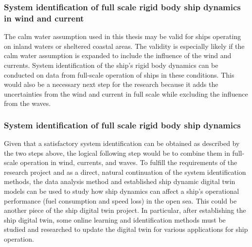\subsubsection*{\normalfont \color{black} \textbf{System identification of full scale rigid body ship dynamics in wind and current}}
The calm water assumption used in this thesis may be valid for ships operating on inland waters or sheltered coastal areas. The validity is especially likely if the calm water assumption is expanded to include the influence of the wind and currents. System identification of the ship's rigid body dynamics can be conducted on data from full-scale operation of ships in these conditions. This would also be a necessary next step for the research because it adds the uncertainties from the wind and current in full scale while excluding the influence from the waves.

\subsubsection*{\normalfont \color{black} \textbf{System identification of full scale rigid body ship dynamics}}
Given that a satisfactory system identification can be obtained as described by the two steps above, the logical following step would be to combine them in full-scale operation in wind, currents, and waves. To fulfill the requirements of the research project and as a direct, natural continuation of the system identification methods, the data analysis method and established ship dynamic digital twin models can be used to study how ship dynamics can affect a ship's operational performance (fuel consumption and speed loss) in the open sea. This could be another piece of the ship digital twin project. In particular, after establishing the ship digital twin, some online learning and identification methods must be studied and researched to update the digital twin for various applications for ship operation.